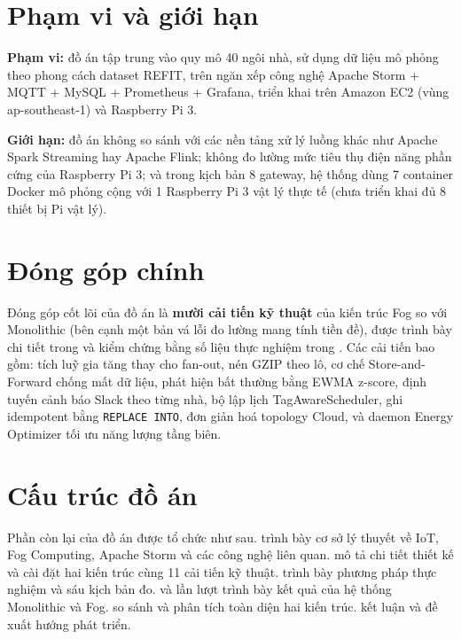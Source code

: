 \documentclass[13pt,a4paper]{report}
\newcommand{\code}[1]{\texttt{\small #1}}
\begin{document}
\section{Phạm vi và giới hạn}

\textbf{Phạm vi:} đồ án tập trung vào quy mô 40 ngôi nhà, sử dụng dữ liệu mô phỏng
theo phong cách dataset REFIT, trên ngăn xếp công nghệ Apache Storm + MQTT +
MySQL + Prometheus + Grafana, triển khai trên Amazon EC2 (vùng ap-southeast-1) và
Raspberry Pi 3.

\textbf{Giới hạn:} đồ án không so sánh với các nền tảng xử lý luồng khác như Apache
Spark Streaming hay Apache Flink; không đo lường mức tiêu thụ điện năng phần cứng
của Raspberry Pi 3; và trong kịch bản 8 gateway, hệ thống dùng 7 container Docker
mô phỏng cộng với 1 Raspberry Pi 3 vật lý thực tế (chưa triển khai đủ 8 thiết bị
Pi vật lý).

\section{Đóng góp chính}

Đóng góp cốt lõi của đồ án là \textbf{mười cải tiến kỹ thuật} của kiến trúc Fog so
với Monolithic (bên cạnh một bản vá lỗi đo lường mang tính tiền đề), được trình
bày chi tiết trong  và kiểm chứng bằng số liệu thực nghiệm trong
. Các cải tiến bao gồm: tích luỹ gia tăng thay cho
fan-out, nén GZIP theo lô, cơ chế Store-and-Forward chống mất dữ liệu, phát hiện
bất thường bằng EWMA z-score, định tuyến cảnh báo Slack theo từng nhà, bộ lập lịch
TagAwareScheduler, ghi idempotent bằng \code{REPLACE INTO}, đơn giản hoá topology
Cloud, và daemon Energy Optimizer tối ưu năng lượng tầng biên.

\section{Cấu trúc đồ án}

Phần còn lại của đồ án được tổ chức như sau. \textbf{} trình bày cơ
sở lý thuyết về IoT, Fog Computing, Apache Storm và các công nghệ liên quan.
\textbf{} mô tả chi tiết thiết kế và cài đặt hai kiến trúc cùng 11
cải tiến kỹ thuật. \textbf{} trình bày phương pháp thực nghiệm
và sáu kịch bản đo. \textbf{} và \textbf{}
lần lượt trình bày kết quả của hệ thống Monolithic và Fog. \textbf{}
so sánh và phân tích toàn diện hai kiến trúc. \textbf{} kết luận
và đề xuất hướng phát triển.
\end{document}

